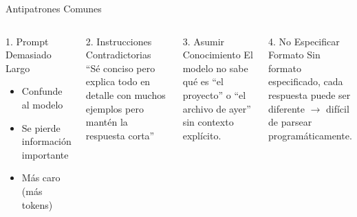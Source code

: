 \documentclass[aspectratio=169]{beamer}
\begin{document}
\begin{frame}{Antipatrones Comunes}
    \begin{columns}[t]
        \begin{alertblock}{1. Prompt Demasiado Largo}
            \begin{itemize}
                \item Confunde al modelo
                \item Se pierde información importante
                \item Más caro (más tokens)
            \end{itemize}
        \end{alertblock}
        
        \begin{alertblock}{2. Instrucciones Contradictorias}
            ``Sé conciso pero explica todo en detalle con muchos ejemplos pero mantén la respuesta corta''
        \end{alertblock}
        
        \begin{alertblock}{3. Asumir Conocimiento}
            El modelo no sabe qué es ``el proyecto'' o ``el archivo de ayer'' sin contexto explícito.
        \end{alertblock}
        
        \begin{alertblock}{4. No Especificar Formato}
            Sin formato especificado, cada respuesta puede ser diferente $\rightarrow$ difícil de parsear programáticamente.
        \end{alertblock}
    \end{columns}
\end{frame}
\end{document}
